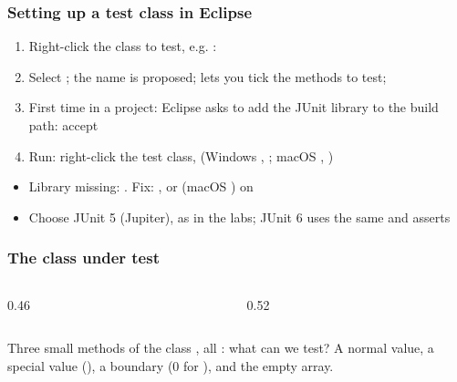 \documentclass[aspectratio=169,10pt,compress]{beamer}
\begin{document}
\begin{frame}[t,fragile] \frametitle{Setting up a test class in Eclipse}
	\begin{enumerate}\small
		\item Right-click the class to test, e.g. : 
		\item Select ; the name  is proposed;  lets you tick the
			  methods to test; 
		\item First time in a project: Eclipse asks to add the JUnit library to the build path: accept
		\item Run: right-click the test class, 
			  (Windows , ; macOS , )
	\end{enumerate}

	\vspace{0.5em}
	\begin{itemize}\small
		\item Library missing: . Fix: , or  (macOS ) on 
		\item Choose JUnit 5 (Jupiter), as in the labs; JUnit 6 uses the same  and asserts
	\end{itemize}
\end{frame}




\begin{frame}[t,fragile] \frametitle{The class under test}
	\begin{columns}[T]
		\begin{column}{0.46\textwidth}
		\end{column}
		\begin{column}{0.52\textwidth}
		\end{column}
	\end{columns}

	\small Three small methods of the class , all : what can we test?
	A normal value, a special value (), a boundary (0 for ), and the empty array.
\end{frame}
\end{document}
